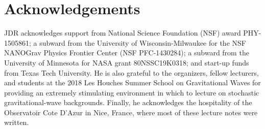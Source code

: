 \section*{Acknowledgements}
\label{s:acknowledgements}

JDR acknowledges support from National Science Foundation (NSF)
award PHY-1505861; a subward from the University of Wisconsin-Milwaukee
for the NSF NANOGrav Physics Frontier Center (NSF PFC-1430284); 
a subward from the University of Minnesota for NASA grant 80NSSC19K0318; 
and start-up funds from Texas Tech University.
He is also grateful to the organizers, fellow lecturers, and students
at the 2018 Les Houches Summer School on Gravitational Waves for 
providing an extremely stimulating environment in which to lecture on 
stochastic gravitational-wave backgrounds.
Finally, he acknowledges the hospitality of the Observatoir Cote
D'Azur in Nice, France, where most of these lecture notes were written. 
